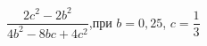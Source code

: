 \begin{ex}[type=simplify_calculate]
	\begin{condition}
		\( \dfrac{2c^2-2b^2}{4b^2-8bc+4c^2} \),\quad при \( b=0,25 \), \( c=\dfrac{1}{3} \)
	\end{condition}
\end{ex}